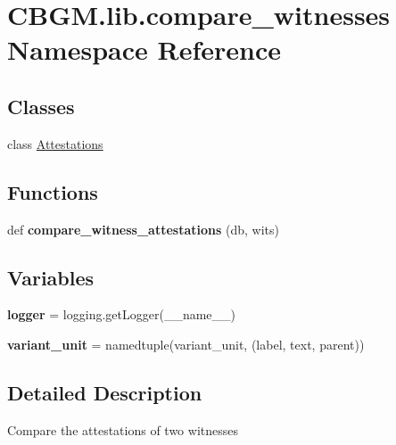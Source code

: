 \hypertarget{namespaceCBGM_1_1lib_1_1compare__witnesses}{}\section{C\+B\+G\+M.\+lib.\+compare\+\_\+witnesses Namespace Reference}
\label{namespaceCBGM_1_1lib_1_1compare__witnesses}
\subsection*{Classes}
\begin{DoxyCompactItemize}
\item 
class \hyperlink{classCBGM_1_1lib_1_1compare__witnesses_1_1Attestations}{Attestations}
\end{DoxyCompactItemize}
\subsection*{Functions}
\begin{DoxyCompactItemize}
\item 
\mbox{\label{namespaceCBGM_1_1lib_1_1compare__witnesses_acb818c1fd65e467177bf0b51bd90b313}} 
def {\bfseries compare\+\_\+witness\+\_\+attestations} (db, wits)
\end{DoxyCompactItemize}
\subsection*{Variables}
\begin{DoxyCompactItemize}
\item 
\mbox{\label{namespaceCBGM_1_1lib_1_1compare__witnesses_a866b81dc22b7b20eb95504cfcc5c62f2}} 
{\bfseries logger} = logging.\+get\+Logger(\+\_\+\+\_\+name\+\_\+\+\_\+)
\item 
\mbox{\label{namespaceCBGM_1_1lib_1_1compare__witnesses_ab2f67a58e420a9ca7632fff5c61b0813}} 
{\bfseries variant\+\_\+unit} = namedtuple(\textquotesingle{}variant\+\_\+unit\textquotesingle{}, (\textquotesingle{}label\textquotesingle{}, \textquotesingle{}text\textquotesingle{}, \textquotesingle{}parent\textquotesingle{}))
\end{DoxyCompactItemize}


\subsection{Detailed Description}
\begin{DoxyVerb}Compare the attestations of two witnesses
\end{DoxyVerb}
 